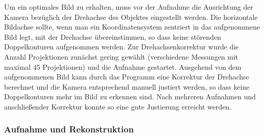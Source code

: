 \documentclass[11pt, a4paper]{article}
\numberwithin{equation}{section}
\begin{document}
Um ein optimales Bild zu erhalten, muss vor der Aufnahme die Ausrichtung der Kamera bezüglich der Drehachse des Objektes eingestellt werden.
Die horizontale Bildachse sollte, wenn man ein Koordinatensystem zentriert in das aufgenommene Bild legt, mit der Drehachse übereinstimmen, so dass keine störenden Doppelkonturen aufgenommen werden.
Zur Drehachsenkorrektur wurde die Anzahl Projektionen zunächst gering gewählt (verschiedene Messungen mit maximal \num{45} Projektionen) und die Aufnahme gestartet.
Ausgehend von dem aufgenommenen Bild kann durch das Programm eine Korrektur der Drehachse berechnet und die Kamera entsprechend manuell justiert werden, so dass keine Doppelkonturen mehr im Bild zu erkennen sind.
Nach mehreren Aufnahmen und anschließender Korrektur konnte so eine gute Justierung erreicht werden.

\subsubsection{Aufnahme und Rekonstruktion}
\label{ct_aufnahme}
\end{document}

